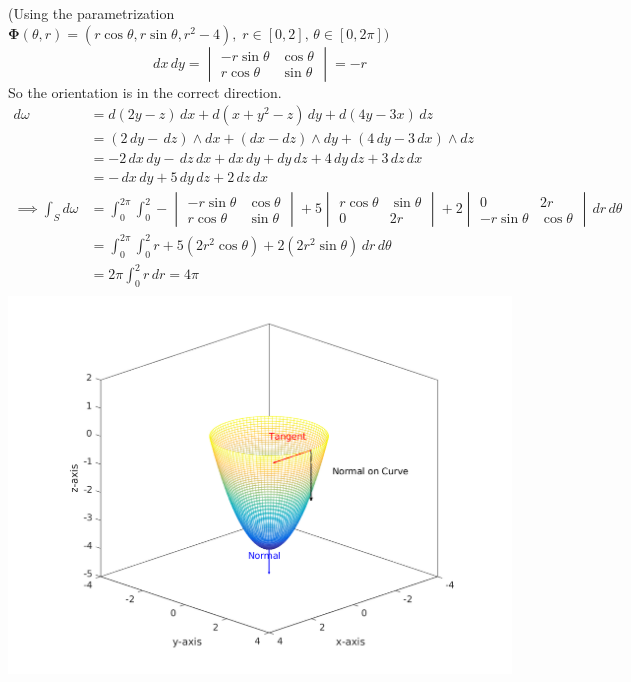 \documentclass{article}
\begin{document}
\begin{enumerate}
        (Using the parametrization 
        $\boldsymbol \Phi (\theta,r) 
        = (r\cos \theta, r\sin \theta, r^2 - 4),\; 
        r \in [0, 2],\, \theta \in [0, 2\pi])$
        \[ dx\, dy = 
        \begin{vmatrix} -r\sin\theta & \cos \theta \\
                         r \cos \theta & \sin \theta 
        \end{vmatrix} = -r\]
        So the orientation is in the correct direction.
        \begin{align*}
            d\omega &= d(2y-z)\, dx + d(x+y^2-z)\, dy + d(4y -3x)\, dz \\
            &= (2\, dy - \,dz) \wedge dx 
            + (dx - dz) \wedge dy 
            + (4 \, dy -  3\, dx) \wedge dz \\
            &= -2\, dx\, dy - \,dz \, dx + dx \, dy + dy \, dz 
            + 4 \, dy \, dz +  3\, dz \, dx \\
            &= -\, dx\, dy + 5 \, dy \, dz +  2\, dz \, dx \\
            \implies \int_S d\omega &= \int_0^{2\pi} \int_0^2 
            - \begin{vmatrix} -r \sin\theta & \cos \theta \\ 
                               r \cos \theta & \sin \theta \end{vmatrix}
            + 5 \begin{vmatrix} r\cos \theta & \sin \theta \\ 
                                0 & 2r \end{vmatrix}
            + 2 \begin{vmatrix} 0 & 2r \\ 
                               -r\sin\theta & \cos \theta \end{vmatrix} 
            \, dr \, d\theta \\
            &= \int_0^{2\pi} \int_0^2 r + 5 (2r^2\cos \theta) 
            + 2(2r^2 \sin \theta) \, dr \, d\theta\\
            &= 2\pi \int_0^2 r \, dr = 4\pi \\
        \end{align*} 
            \includegraphics[width=\textwidth,center]{b42-a10-6}


\end{enumerate}
\end{document}
